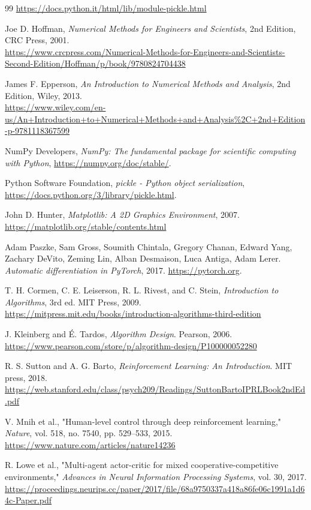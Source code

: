 \documentclass[twoside]{article}
\begin{document}
\begin{thebibliography}{99}
\url{https://docs.python.it/html/lib/module-pickle.html}

 Joe D. Hoffman, \textit{Numerical Methods for Engineers and Scientists}, 2nd Edition, CRC Press, 2001.\\
\url{https://www.crcpress.com/Numerical-Methods-for-Engineers-and-Scientists-Second-Edition/Hoffman/p/book/9780824704438}

 James F. Epperson, \textit{An Introduction to Numerical Methods and Analysis}, 2nd Edition, Wiley, 2013.\\
\url{https://www.wiley.com/en-us/An+Introduction+to+Numerical+Methods+and+Analysis%2C+2nd+Edition-p-9781118367599}

 NumPy Developers, \textit{NumPy: The fundamental package for scientific computing with Python}, \url{https://numpy.org/doc/stable/}.

 Python Software Foundation, \textit{pickle - Python object serialization}, \url{https://docs.python.org/3/library/pickle.html}.

John D. Hunter, \textit{Matplotlib: A 2D Graphics Environment}, 2007.
\url{https://matplotlib.org/stable/contents.html}

 Adam Paszke, Sam Gross, Soumith Chintala, Gregory Chanan, Edward Yang, Zachary DeVito, Zeming Lin, Alban Desmaison, Luca Antiga, Adam Lerer. \textit{Automatic differentiation in PyTorch}, 2017. \url{https://pytorch.org}.

 T. H. Cormen, C. E. Leiserson, R. L. Rivest, and C. Stein, \textit{Introduction to Algorithms}, 3rd ed. MIT Press, 2009. \url{https://mitpress.mit.edu/books/introduction-algorithms-third-edition}

 J. Kleinberg and É. Tardos, \textit{Algorithm Design}. Pearson, 2006. \url{https://www.pearson.com/store/p/algorithm-design/P100000052280}

 R. S. Sutton and A. G. Barto, \textit{Reinforcement Learning: An Introduction}. MIT press, 2018. \url{https://web.stanford.edu/class/psych209/Readings/SuttonBartoIPRLBook2ndEd.pdf}

 V. Mnih et al., "Human-level control through deep reinforcement learning," \textit{Nature}, vol. 518, no. 7540, pp. 529--533, 2015. \url{https://www.nature.com/articles/nature14236}

 R. Lowe et al., "Multi-agent actor-critic for mixed cooperative-competitive environments," \textit{Advances in Neural Information Processing Systems}, vol. 30, 2017. \url{https://proceedings.neurips.cc/paper/2017/file/68a9750337a418a86fe06c1991a1d64c-Paper.pdf}


\end{thebibliography}
\end{document}

